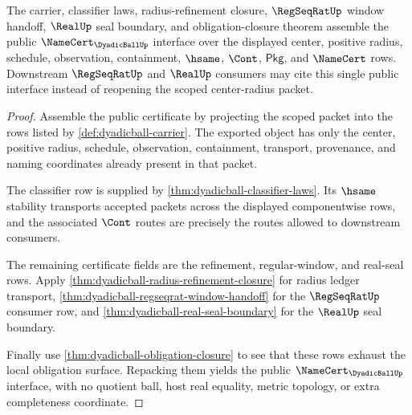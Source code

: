 \begin{theorem}
\label{thm:dyadicball-center-radius-public-interface}
The carrier, classifier laws, radius-refinement closure, $\RegSeqRatUp$ window
handoff, $\RealUp$ seal boundary, and obligation-closure theorem assemble the
public $\NameCert_{\DyadicBallUp}$ interface over the displayed center,
positive radius, schedule, observation, containment, $\hsame$, $\Cont$,
$\mathsf{Pkg}$, and $\NameCert$ rows. Downstream $\RegSeqRatUp$ and $\RealUp$
consumers may cite this single public interface instead of reopening the scoped
center-radius packet.
\end{theorem}
\begin{proof}
Assemble the public certificate by projecting the scoped packet into the rows
listed by \autoref{def:dyadicball-carrier}. The exported object has only the
center, positive radius, schedule, observation, containment, transport,
provenance, and naming coordinates already present in that packet.

The classifier row is supplied by
\autoref{thm:dyadicball-classifier-laws}. Its $\hsame$ stability transports
accepted packets across the displayed componentwise rows, and the associated
$\Cont$ routes are precisely the routes allowed to downstream consumers.

The remaining certificate fields are the refinement, regular-window, and
real-seal rows. Apply \autoref{thm:dyadicball-radius-refinement-closure} for
radius ledger transport, \autoref{thm:dyadicball-regseqrat-window-handoff} for
the $\RegSeqRatUp$ consumer row, and
\autoref{thm:dyadicball-real-seal-boundary} for the $\RealUp$ seal boundary.

Finally use \autoref{thm:dyadicball-obligation-closure} to see that these rows
exhaust the local obligation surface. Repacking them yields the public
$\NameCert_{\DyadicBallUp}$ interface, with no quotient ball, host real
equality, metric topology, or extra completeness coordinate.
\end{proof}

